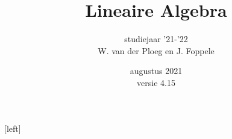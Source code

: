 \usepackage[dutch]{babel}
\usepackage{graphicx}
\usepackage{nicefrac}
\usepackage{xcolor}
\usepackage{cancel} 
\usepackage{gensymb}
\usepackage{enumitem}
\usepackage{listings}
\usepackage{placeins}
\usepackage{imakeidx}
\usepackage{multicol}
\usepackage{geometry}	%
\usepackage{marginnote}[left]	%
\usepackage{latexsym}
\usepackage{mathtools} 
\usepackage{float}
\usepackage{amsmath}
\usepackage{amssymb}
\usepackage{amsthm}
\usepackage{newtxtext, newtxmath}
\usepackage{wasysym}
\usepackage{sectsty}
\usepackage{hyperref}  %

\makeindex[name = definities, title=index van definities , intoc]
\makeindex[name = eigenschappen, title=index van eigenschappen,  intoc]
\makeindex[name = voorbeelden, title=index van voorbeelden,  intoc]

\setcounter{secnumdepth}{0}

\usepackage[T1]{fontenc}
\usepackage[utf8]{inputenc}
\usepackage[font=small,labelfont=bf]{caption}
\subsubsectionfont{\centering}


	\title{Lineaire Algebra\\
    }
	\author{studiejaar '21-'22\\W. van der Ploeg en J. Foppele}
	\date{augustus 2021 \\ \normalsize versie 4.15}
	\maketitle
   \thispagestyle{empty}

